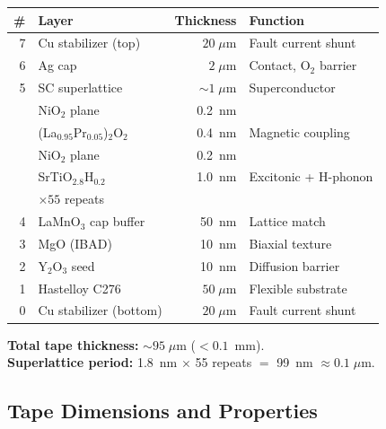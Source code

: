 \documentclass[11pt, a4paper]{article}
\begin{document}
\begin{center}
\begin{tabular}{@{}rp{4cm}rl@{}}
\toprule
\textbf{\#} & \textbf{Layer} & \textbf{Thickness} & \textbf{Function} \\
\midrule
7 & Cu stabilizer (top) & $20\;\mu$m & Fault current shunt \\
6 & Ag cap & $2\;\mu$m & Contact, O$_2$ barrier \\
5 & SC superlattice & $\sim 1\;\mu$m & Superconductor \\
  & \quad NiO$_2$ plane & 0.2~nm & \\
  & \quad (La$_{0.95}$Pr$_{0.05}$)$_2$O$_2$ & 0.4~nm & Magnetic coupling \\
  & \quad NiO$_2$ plane & 0.2~nm & \\
  & \quad SrTiO$_{2.8}$H$_{0.2}$ & 1.0~nm & Excitonic + H-phonon \\
  & \quad $\times 55$ repeats & & \\
4 & LaMnO$_3$ cap buffer & 50~nm & Lattice match \\
3 & MgO (IBAD) & 10~nm & Biaxial texture \\
2 & Y$_2$O$_3$ seed & 10~nm & Diffusion barrier \\
1 & Hastelloy C276 & $50\;\mu$m & Flexible substrate \\
0 & Cu stabilizer (bottom) & $20\;\mu$m & Fault current shunt \\
\bottomrule
\end{tabular}
\end{center}

\textbf{Total tape thickness:} $\sim 95\;\mu$m ($< 0.1$~mm). \\
\textbf{Superlattice period:} 1.8~nm $\times$ 55 repeats $=$ 99~nm
$\approx 0.1\;\mu$m.

\subsection{Tape Dimensions and Properties}
\end{document}

